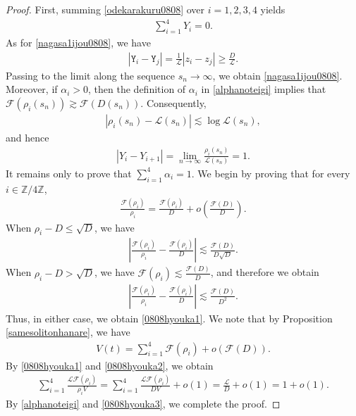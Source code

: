 \documentclass[reqno]{amsart}
\theoremstyle{plain}
\theoremstyle{definition}
\numberwithin{equation}{section}
\begin{document}
\begin{proof}
First, summing \eqref{odekarakuru0808} over $i=1,2,3,4$ yields
\begin{align*}
\sum_{i=1}^4Y_i=0.
\end{align*}
As for \eqref{nagasa1ijou0808}, we have
\begin{align*}
\left|\mathtt{Y}_i-\mathtt{Y}_j\right|
=
\frac{1}{\mathcal{L}}\left|z_i-z_j\right|
\geq
\frac{D}{\mathcal{L}}.
\end{align*}
Passing to the limit along the sequence $s_n\to\infty$, we obtain \eqref{nagasa1ijou0808}. Moreover, if $\alpha_i>0$, then the definition of $\alpha_i$ in
\eqref{alphanoteigi} implies that $\mathcal{F}(\rho_i(s_n)) \gtrsim \mathcal{F}(D(s_n))$. Consequently,
\begin{align*}
\left|\rho_i(s_n)-\mathcal{L}(s_n)\right|
\lesssim \log{\mathcal{L}(s_n)},
\end{align*}
and hence
\begin{align*}
|Y_i-Y_{i+1}|
=
\lim_{n\to\infty}
\frac{\rho_i(s_n)}{\mathcal{L}(s_n)}
=1.
\end{align*}
It remains only to prove that $\sum_{i=1}^4\alpha_i=1$. We begin by proving that for every $i\in\mathbb{Z}/4\mathbb{Z}$, 
\begin{align}\label{0808hyouka1}
\frac{\mathcal{F}(\rho_i)}{\rho_i}=\frac{\mathcal{F}(\rho_i)}{D}+o\left(\frac{\mathcal{F}(D)}{D}\right).
\end{align}
When $\rho_i-D\leq \sqrt{D}$, we have
\begin{align*}
\left|\frac{\mathcal{F}(\rho_i)}{\rho_i}-\frac{\mathcal{F}(\rho_i)}{D}\right|\lesssim \frac{\mathcal{F}(D)}{D\sqrt{D}}.
\end{align*}
When $\rho_i-D>\sqrt{D}$, we have $\mathcal{F}(\rho_i)\lesssim \frac{\mathcal{F}(D)}{D}$, and therefore we obtain
\begin{align*}
\left|\frac{\mathcal{F}(\rho_i)}{\rho_i}-\frac{\mathcal{F}(\rho_i)}{D}\right|\lesssim \frac{\mathcal{F}(D)}{D^2}.
\end{align*}
Thus, in either case, we obtain \eqref{0808hyouka1}. We note that by Proposition \ref{samesolitonhanare}, we have
\begin{align}\label{0808hyouka2}
V(t)=\sum_{i=1}^4\mathcal{F}(\rho_i)+o\left(\mathcal{F}(D)\right).
\end{align}
By \eqref{0808hyouka1} and \eqref{0808hyouka2}, we obtain
\begin{align}\label{0808hyouka3}
\sum_{i=1}^4\frac{\mathcal{L}\mathcal{F}(\rho_i)}{\rho_iV}=\sum_{i=1}^4\frac{\mathcal{L}\mathcal{F}(\rho_i)}{DV}+o(1)=\frac{\mathcal{L}}{D}+o(1)=1+o(1).
\end{align}
By \eqref{alphanoteigi} and \eqref{0808hyouka3}, we complete the proof.

\end{proof}
\end{document}
